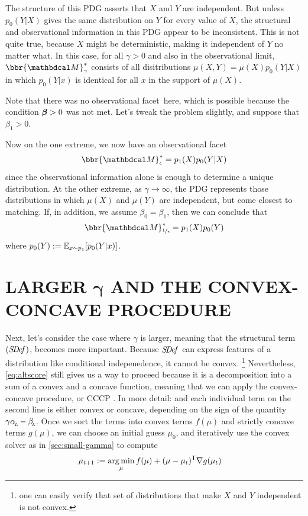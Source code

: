 \documentclass{article}
\newcommand\obslimit{observational facet} %
\begin{document}
The structure of this PDG asserts that $X$ and $Y$ are independent.
But unless $p_0(Y|X)$ gives the same distribution on $Y$ for every value of $X$, the structural and observational information in this PDG appear to be inconsistent.
This is not quite true, because $X$ might be deterministic, making it independent of $Y$ no matter what. 
In this case, for all $\gamma > 0$ and also in the observational limit, 
$\bbr{\dg M}^*_\gamma$ consists of all disitributions $\mu(X,Y) = \mu(X)p_0(Y|X)$ in which
$p_0(Y|x)$ is identical for all $x$ in the support of $\mu(X)$.

Note that there was no \obslimit\ here, which is possible 
because the condition $\boldsymbol\beta > 0$ was not met.  Let's tweak the problem slightly, 
and suppose that $\beta_1 > 0$.

Now on the one extreme, we now have an \obslimit\
\[
    \bbr{\dg M}^*_{\epsilon} = p_1(X) p_0(Y|X)
\]
since the observational information alone is enough to determine a unique distribution.
At the other extreme, as $\gamma \to \infty$, the PDG represents those distributions 
in which $\mu(X)$ and $\mu(Y)$ are independent, but come closest to matching.
If, in addition, we assume $\beta_0 = \beta_1$, then we can conclude that
\[
    \bbr{\dg M}^*_{\nf1\epsilon} = p_1(X) p_0(Y) 
\]
where $p_0(Y) := \operatorname*{\mathbb{E}}_{x \sim p_1}[ p_0(Y|x) ]$.


\section{LARGER
    \texorpdfstring{$\boldsymbol\gamma$}{GAMMA} AND THE CONVEX-CONCAVE PROCEDURE}
    \label{sec:larger-gamma}

Next, let's consider the case where $\gamma$ is
larger, meaning that the structural term $(\mathit{S\mskip-3.5muD\mskip-2.5mue\mskip-1.5muf}_{})$,
becomes more important.
Because $\mathit{S\mskip-3.5muD\mskip-2.5mue\mskip-1.5muf}_{}$ can express features of a distribution like conditional indepenedence,
it cannot be convex.%
    \footnote{one can easily verify that set of distributions that make $X$ and $Y$ independent is not convex.}
Nevertheless, \eqref{eq:altscore} still gives us a way to proceed because it is a decomposition into a sum of a convex and a concave function, meaning that we can apply the convex-concave procedure, or CCCP \parencite{yuille2003concave}.
In more detail: and each individual term on the second line is either convex or concave, depending on the sign of the quantity $\gamma \alpha_{\!_{L}\!} - \beta_{\!_{L}\!}$.
Once we sort the terms into convex terms $f(\mu)$ and strictly concave terms $g(\mu)$, we can choose an initial guess $\mu_0$, and iteratively use the convex solver as in \cref{sec:small-gamma} to compute
%
\begin{align*}
    \mu_{t+1} &:= \operatorname*{arg\,min}_{\mu} f(\mu) + (\mu - \mu_{t})^{\sf T}
        \nabla g(\mu_t)
\end{align*}
\end{document}
